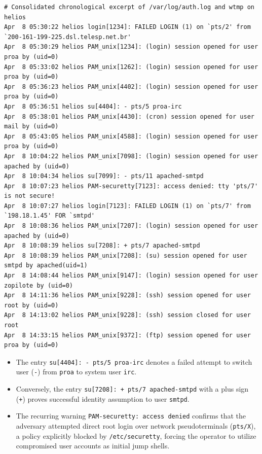 \begin{lstlisting}[style=terminal]
# Consolidated chronological excerpt of /var/log/auth.log and wtmp on helios
Apr  8 05:30:22 helios login[1234]: FAILED LOGIN (1) on `pts/2' from `200-161-199-225.dsl.telesp.net.br'
Apr  8 05:30:29 helios PAM_unix[1234]: (login) session opened for user proa by (uid=0)
Apr  8 05:33:02 helios PAM_unix[1262]: (login) session opened for user proa by (uid=0)
Apr  8 05:36:23 helios PAM_unix[4402]: (login) session opened for user proa by (uid=0)
Apr  8 05:36:51 helios su[4404]: - pts/5 proa-irc
Apr  8 05:38:01 helios PAM_unix[4430]: (cron) session opened for user mail by (uid=0)
Apr  8 05:43:05 helios PAM_unix[4588]: (login) session opened for user proa by (uid=0)
Apr  8 10:04:22 helios PAM_unix[7098]: (login) session opened for user apached by (uid=0)
Apr  8 10:04:34 helios su[7099]: - pts/11 apached-smtpd
Apr  8 10:07:23 helios PAM-securetty[7123]: access denied: tty 'pts/7' is not secure!
Apr  8 10:07:27 helios login[7123]: FAILED LOGIN (1) on `pts/7' from `198.18.1.45' FOR `smtpd'
Apr  8 10:08:36 helios PAM_unix[7207]: (login) session opened for user apached by (uid=0)
Apr  8 10:08:39 helios su[7208]: + pts/7 apached-smtpd
Apr  8 10:08:39 helios PAM_unix[7208]: (su) session opened for user smtpd by apached(uid=1)
Apr  8 14:08:44 helios PAM_unix[9147]: (login) session opened for user zopilote by (uid=0)
Apr  8 14:11:36 helios PAM_unix[9228]: (ssh) session opened for user root by (uid=0)
Apr  8 14:13:02 helios PAM_unix[9228]: (ssh) session closed for user root
Apr  8 14:33:15 helios PAM_unix[9372]: (ftp) session opened for user proa by (uid=0)
\end{lstlisting}

\begin{notaforense}
\begin{itemize}
    \item The entry \texttt{su[4404]: - pts/5 proa-irc} denotes a failed attempt to switch user (\texttt{-}) from \texttt{proa} to system user \texttt{irc}.
    \item Conversely, the entry \texttt{su[7208]: + pts/7 apached-smtpd} with a plus sign (\texttt{+}) proves successful identity assumption to user \texttt{smtpd}.
    \item The recurring warning \texttt{PAM-securetty: access denied} confirms that the adversary attempted direct root login over network pseudoterminals (\texttt{pts/X}), a policy explicitly blocked by \texttt{/etc/securetty}, forcing the operator to utilize compromised user accounts as initial jump shells.
\end{itemize}
\end{notaforense}

